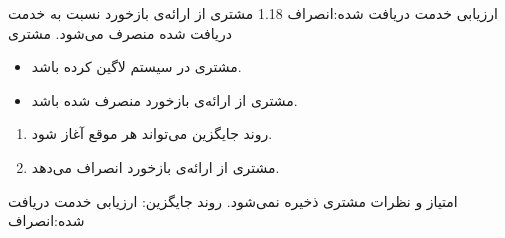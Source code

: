 \alternativeflow
{
ارزیابی خدمت دریافت شده:انصراف
}
{1.18}
{
مشتری از ارائه‌ی بازخورد نسبت به خدمت دریافت شده منصرف می‌شود.
}
{
	مشتری
}
{}
{
	\begin{itemize}
		\vspace*{-0.6cm}
		\item 
		مشتری در سیستم لاگین کرده باشد.
		\item
		مشتری از ارائه‌ی بازخورد منصرف شده باشد.
	\end{itemize}
}
{
	\vspace*{-0.6cm}
	\begin{enumerate}
		\item 
		روند جایگزین می‌تواند هر موقع آغاز شود.
		\item
		مشتری از ارائه‌ی بازخورد انصراف می‌دهد.
	\end{enumerate}
}
{
امتیاز و نظرات مشتری ذخیره نمی‌شود.
}
{
روند جایگزین: ارزیابی خدمت دریافت شده:انصراف
}




